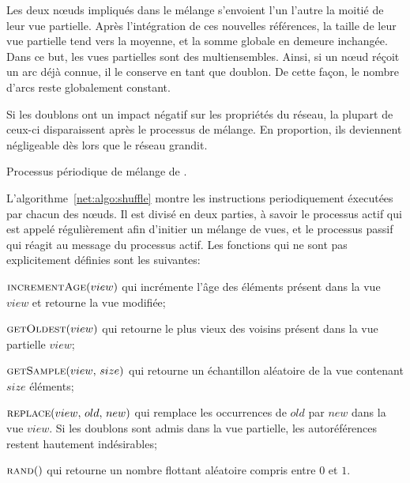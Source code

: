 Les deux nœuds impliqués dans le mélange s'envoient l'un l'autre la moitié de
leur vue partielle. Après l'intégration de ces nouvelles références, la taille
de leur vue partielle tend vers la moyenne, et la somme globale en demeure
inchangée. Dans ce but, les vues partielles sont des multiensembles. Ainsi, si
un nœud réçoit un arc déjà connue, il le conserve en tant que doublon.  De cette
façon, le nombre d'arcs reste globalement constant.

Si les doublons ont un impact négatif sur les propriétés du réseau, la plupart
de ceux-ci disparaissent après le processus de mélange. En proportion, ils
deviennent négligeable dès lors que le réseau grandit.

\begin{algorithm}[h]
  
  \caption[Processus périodique de mélange de \SPRAY]
  {\label{net:algo:shuffle}Processus périodique de mélange de \SPRAY.}
\end{algorithm}

L'algorithme~\ref{net:algo:shuffle} montre les instructions periodiquement
éxecutées par chacun des nœuds. Il est divisé en deux parties, à savoir le
processus actif qui est appelé régulièrement afin d'initier un mélange de vues,
et le processus passif qui réagit au message du processus actif. Les fonctions
qui ne sont pas explicitement définies sont les suivantes:
\begin{inparaenum}[]
\item $\textsc{incrementAge}(view)$ qui incrémente l'âge des éléments présent
  dans la vue $view$ et retourne la vue modifiée;
\item $\textsc{getOldest}(view)$ qui retourne le plus vieux des voisins présent
  dans la vue partielle $view$;
\item $\textsc{getSample}(view,\, size)$ qui retourne un échantillon aléatoire
  de la vue contenant $size$ éléments;
\item $\textsc{replace}(view,\,old,\,new)$ qui remplace les occurrences de $old$
  par $new$ dans la vue $view$. Si les doublons sont admis dans la vue
  partielle, les autoréférences restent hautement indésirables;
\item $\textsc{rand}()$ qui retourne un nombre flottant aléatoire compris entre
  $0$ et $1$.
\end{inparaenum}

